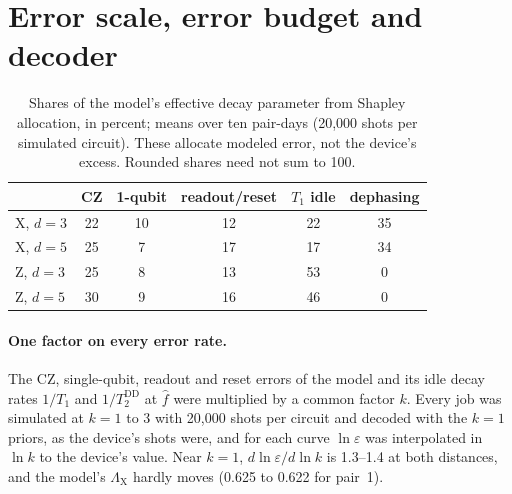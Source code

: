 \documentclass[aps,pra,reprint,nofootinbib,longbibliography,floatfix,showkeys]{revtex4-2}
\newcommand{\eps}{\varepsilon}
\newcommand{\LX}{\Lambda_{\mathrm{X}}}
\newcommand{\fhat}{\hat f}
\begin{document}
\section{Error scale, error budget and decoder}
\label{app:budget}

\begin{table}[tb]
\caption{Shares of the model's effective decay parameter from Shapley allocation, in percent; means over ten pair-days (20,000 shots per simulated circuit).
These allocate modeled error, not the device's excess. Rounded shares need not sum to 100.}
\label{tab:budget}
\scriptsize
\setlength{\tabcolsep}{3pt}
\begin{ruledtabular}
\begin{tabular}{lccccc}
 & CZ & 1-qubit & readout/reset & $T_1$ idle & dephasing \\
\hline
X, $d=3$ & 22 & 10 & 12 & 22 & 35 \\
X, $d=5$ & 25 & 7 & 17 & 17 & 34 \\
Z, $d=3$ & 25 & 8 & 13 & 53 & 0 \\
Z, $d=5$ & 30 & 9 & 16 & 46 & 0 \\
\end{tabular}
\end{ruledtabular}
\end{table}

\paragraph*{One factor on every error rate.}
The CZ, single-qubit, readout and reset errors of the model and its idle decay rates $1/T_1$ and $1/T_2^{\mathrm{DD}}$ at $\fhat$ were multiplied by a common factor $k$.
Every job was simulated at $k = 1$ to 3 with 20,000 shots per circuit and decoded with the $k=1$ priors, as the device's shots were, and for each curve $\ln\eps$ was interpolated in $\ln k$ to the device's value.
Near $k=1$, $d\ln\eps/d\ln k$ is 1.3--1.4 at both distances, and the model's $\LX$ hardly moves (0.625 to 0.622 for pair~1).
\end{document}
